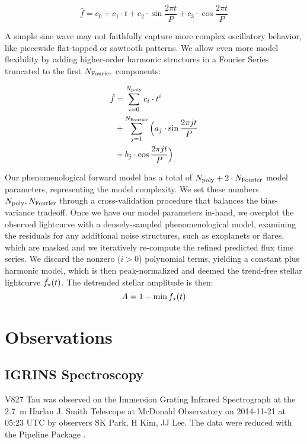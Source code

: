 \documentclass[twocolumn]{emulateapj}%
\begin{document}
\begin{equation}
\hat f = c_0 + c_1 \cdot t + c_2 \cdot \sin{\frac{2\pi t}{P}} + c_3 \cdot \cos{\frac{2\pi t}{P}}
\end{equation}

A simple sine wave may not faithfully capture more complex oscillatory behavior, like piecewide flat-topped or sawtooth patterns.  We allow even more model flexibility by adding higher-order harmonic structures in a Fourier Series \citep{vanderplas15a} truncated to the first $N_{\rm Fourier}$ components:

\begin{equation}
  \begin{split}
 \hat f  & =  \sum_{i=0}^{N_{\rm poly}} c_i \cdot t^i \\
         & + \sum_{j=1}^{N_{\rm Fourier}} \Big( a_j \cdot \sin{\frac{2\pi j t}{P}} \\
         & + b_j \cdot \cos{\frac{2\pi j t}{P}} \Big)
\end{split}
\end{equation}

Our phenomenological forward model has a total of $N_{\rm poly}+2 \cdot N_{\rm Fourier}$ model parameters, representing the model complexity.  We set these numbers $N_{\rm poly}, N_{\rm Fourier}$ through a cross-validation procedure that balances the bias-variance tradeoff.  Once we have our model parameters in-hand, we overplot the observed lightcurve with a densely-sampled phenomenological model, examining the residuals for any additional noise structures, such as exoplanets or flares, which are masked and we iteratively re-compute the refined predicted flux time series.  We discard the nonzero ($i>0$) polynomial terms, yielding a constant plus harmonic model, which is then peak-normalized and deemed the trend-free stellar lightcurve $\hat f_{\rm \star}(t)$.  The detrended stellar amplitude is then: $$ A = 1 - \min{f_{\rm \star}(t)}$$



\section{Observations}\label{sec:obs}

\subsection{IGRINS Spectroscopy}\label{sec:igrins}

V827 Tau was observed on the Immersion Grating Infrared Spectrograph \citep[IGRINS]{park14} at the 2.7~m Harlan J. Smith Telescope at McDonald Observatory on 2014-11-21 at 05:23 UTC by observers SK Park, H Kim, JJ Lee.  The data were reduced with the Pipeline Package \citep{jaejoonlee15}.
\end{document}
